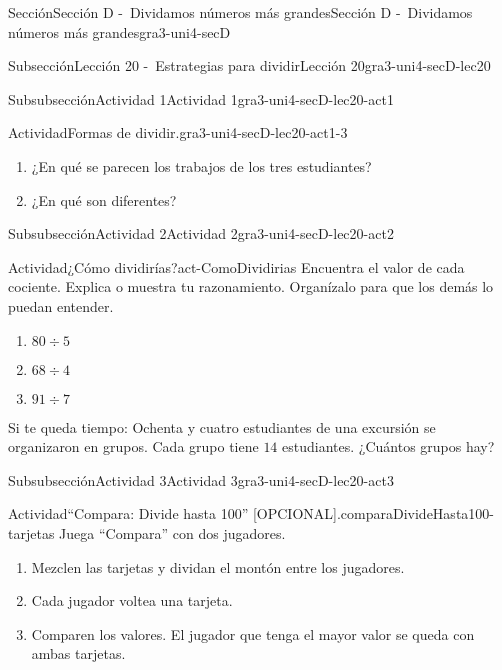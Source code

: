 \documentclass[twoside,10pt,]{article}
\begin{document}
\begin{sectionptx}{Sección}{Sección D -~Dividamos números más grandes}{}{Sección D -~Dividamos números más grandes}{}{}{gra3-uni4-secD}
\begin{subsectionptx}{Subsección}{Lección 20 -~Estrategias para dividir}{}{Lección 20}{}{}{gra3-uni4-secD-lec20}
\begin{subsubsectionptx}{Subsubsección}{Actividad 1}{}{Actividad 1}{}{}{gra3-uni4-secD-lec20-act1}
\begin{activity}{Actividad}{Formas de dividir.}{gra3-uni4-secD-lec20-act1-3}
\begin{enumerate}
\begin{sidebyside}{2}{0}{0}{0}
\begin{sbspanel}{0.5}
Tyler%
\par
\(3\times 20 = 60\)\\
 \(3\times \phantom{0}6 = 18\)\\
 \\
 \(20 + 6 = 26\)%
\end{sbspanel}%
\end{sidebyside}%
\item{}¿En qué se parecen los trabajos de los tres estudiantes?%
\item{}¿En qué son diferentes?%
\end{enumerate}
\end{activity}%
\end{subsubsectionptx}
%
%
\typeout{************************************************}
\typeout{************************************************}
%
\begin{subsubsectionptx}{Subsubsección}{Actividad 2}{}{Actividad 2}{}{}{gra3-uni4-secD-lec20-act2}
\begin{activity}{Actividad}{¿Cómo dividirías?}{act-ComoDividirias}%
Encuentra el valor de cada cociente. Explica o muestra tu razonamiento. Organízalo para que los demás lo puedan entender.%
%
\begin{enumerate}
\item{}\(\displaystyle 80\div 5\)%
\item{}\(\displaystyle 68\div 4\)%
\item{}\(\displaystyle 91\div 7\)%
\end{enumerate}
Si te queda tiempo: Ochenta y cuatro estudiantes de una excursión se organizaron en grupos. Cada grupo tiene \(14\) estudiantes. ¿Cuántos grupos hay?%
\end{activity}%
\end{subsubsectionptx}
%
%
\typeout{************************************************}
\typeout{************************************************}
%
\begin{subsubsectionptx}{Subsubsección}{Actividad 3}{}{Actividad 3}{}{}{gra3-uni4-secD-lec20-act3}
\begin{activity}{Actividad}{“Compara: Divide hasta 100” [OPCIONAL].}{comparaDivideHasta100-tarjetas}%
Juega ``Compara'' con dos jugadores.%
%
\begin{enumerate}
\item{}Mezclen las tarjetas y dividan el montón entre los jugadores.%
\item{}Cada jugador voltea una tarjeta.%
\item{}Comparen los valores. El jugador que tenga el mayor valor se queda con ambas tarjetas.%

\end{enumerate}
\end{activity}
\end{subsubsectionptx}
\end{subsectionptx}
\end{sectionptx}
\end{document}
